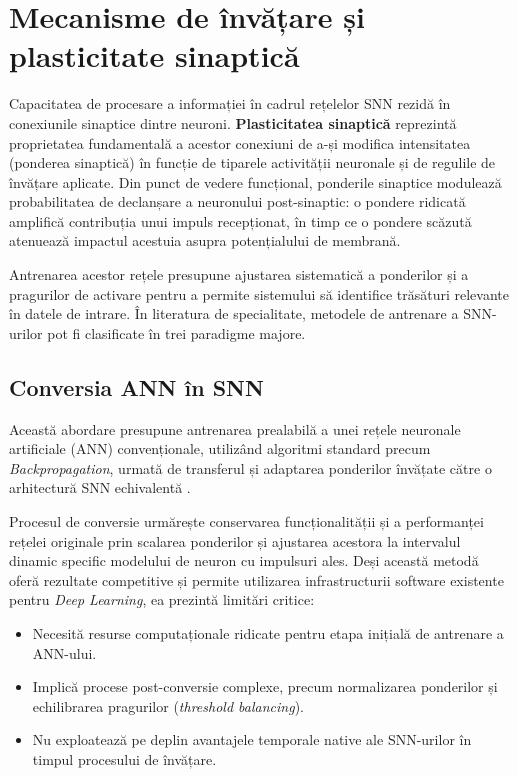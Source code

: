 \section{Mecanisme de învățare și plasticitate sinaptică}

Capacitatea de procesare a informației în cadrul rețelelor SNN rezidă în conexiunile sinaptice dintre neuroni. \textbf{Plasticitatea sinaptică} reprezintă proprietatea fundamentală a acestor conexiuni de a-și modifica intensitatea (ponderea sinaptică) în funcție de tiparele activității neuronale și de regulile de învățare aplicate. Din punct de vedere funcțional, ponderile sinaptice modulează probabilitatea de declanșare a neuronului post-sinaptic: o pondere ridicată amplifică contribuția unui impuls recepționat, în timp ce o pondere scăzută atenuează impactul acestuia asupra po\-ten\-ți\-a\-lu\-lui de membrană.

Antrenarea acestor rețele presupune ajustarea sistematică a ponderilor și a pragurilor de activare pentru a permite sistemului să identifice trăsături relevante în datele de intrare. În literatura de specialitate, metodele de antrenare a SNN-urilor pot fi clasificate în trei paradigme majore.

\subsection*{Conversia ANN în SNN}
Această abordare presupune antrenarea prealabilă a unei rețele neuronale artificiale (ANN) convenționale, utilizând algoritmi standard precum \textit{Backpropagation}, urmată de transferul și adaptarea ponderilor învățate către o arhitectură SNN echivalentă \cite{kugele2020}. 

Procesul de conversie urmărește conservarea funcționalității și a performanței rețelei originale prin scalarea ponderilor și ajustarea acestora la intervalul dinamic specific modelului de neuron cu impulsuri ales. Deși această metodă oferă rezultate competitive și permite utilizarea infrastructurii software existente pentru \textit{Deep Learning}, ea prezintă limitări critice:
\begin{itemize}
    \item Necesită resurse computaționale ridicate pentru etapa inițială de antrenare a ANN-ului.
    \item Implică procese post-conversie complexe, precum normalizarea ponderilor și echilibrarea pragurilor (\textit{threshold balancing}).
    \item Nu exploatează pe deplin avantajele temporale native ale SNN-urilor în timpul procesului de învățare.
\end{itemize}

